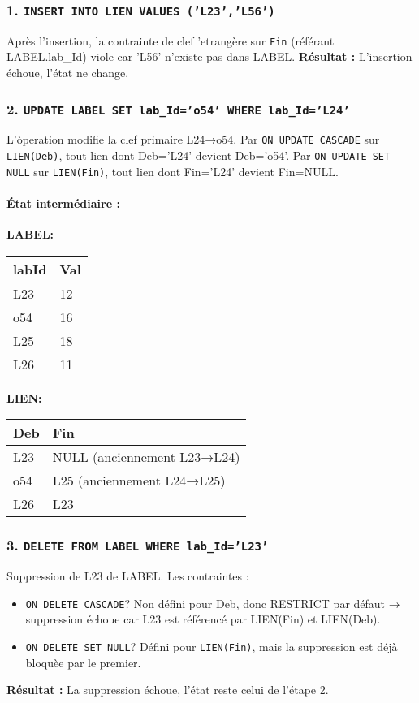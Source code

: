 \documentclass[a4paper,11pt]{article}
\begin{document}
\subsubsection*{1. \texttt{INSERT INTO LIEN VALUES ('L23','L56')} } 
Après l'insertion, la contrainte de clef 'etrang\`ere sur \texttt{Fin} (référant LABEL.lab\_Id) viole car 'L56' n'existe pas dans LABEL. 
\textbf{Résultat :} L'insertion échoue, l'état ne change.

\subsubsection*{2. \texttt{UPDATE LABEL SET lab\_Id='o54' WHERE lab\_Id='L24'} }
L'\`operation modifie la clef primaire L24→o54. Par \texttt{ON UPDATE CASCADE} sur \texttt{LIEN(Deb)}, tout lien dont Deb='L24' devient Deb='o54'. Par \texttt{ON UPDATE SET NULL} sur \texttt{LIEN(Fin)}, tout lien dont Fin='L24' devient Fin=NULL.

\paragraph{État intermédiaire :}
\textbf{LABEL:}
\begin{tabular}{ll}
labId & Val\\ \hline
L23 & 12\\
o54 & 16\\
L25 & 18\\
L26 & 11
\end{tabular}

\textbf{LIEN:}
\begin{tabular}{ll}
Deb & Fin\\ \hline
L23 & NULL \quad (anciennement L23→L24)\\
o54 & L25 \quad (anciennement L24→L25)\\
L26 & L23
\end{tabular}

\subsubsection*{3. \texttt{DELETE FROM LABEL WHERE lab\_Id='L23'} }
Suppression de L23 de LABEL. Les contraintes :
\begin{itemize}
  \item \texttt{ON DELETE CASCADE}? Non défini pour Deb, donc RESTRICT par défaut → suppression échoue car L23 est référencé par LIEN\`(Fin) et LIEN(Deb).
  \item \texttt{ON DELETE SET NULL}? Défini pour \texttt{LIEN(Fin)}, mais la suppression est déjà bloqu\`ee par le premier.
\end{itemize}
\textbf{Résultat :} La suppression échoue, l'état reste celui de l'étape 2.
\end{document}
